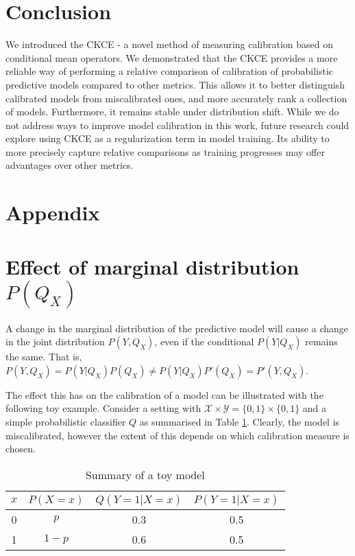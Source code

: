\documentclass[twocolumn]{article}
\theoremstyle{definition}
\begin{document}




\section{Conclusion}

We introduced the CKCE - a novel method of measuring calibration based on conditional mean operators. We demonstrated that the CKCE provides a more reliable way of performing a relative comparison of calibration of probabilistic predictive models compared to other metrics. This allows it to better distinguish calibrated models from miscalibrated ones, and more accurately rank a collection of models. Furthermore, it remains stable under distribution shift. While we do not address ways to improve model calibration in this work, future research could explore using CKCE as a regularization term in model training. Its ability to more precisely capture relative comparisons as training progresses may offer advantages over other metrics.

\newpage 



\newpage
\appendix
\onecolumn

\section*{Appendix}

\section{Effect of marginal distribution $P(Q_X)$} \label{Ap:toy}

A change in the marginal distribution of the predictive model will cause a change in the joint distribution $P(Y, Q_X)$, even if the conditional $P(Y|Q_X)$ remains the same. That is, $P(Y, Q_X) = P(Y|Q_X)P(Q_X) \neq P(Y|Q_X)P'(Q_X) = P'(Y, Q_X)$.  

The effect this has on the calibration of a model can be illustrated with the following toy example. Consider a setting with $\mathcal{X}\times \mathcal{Y} = \{0,1\} \times \{0,1\}$ and a simple probabilistic classifier $Q$ as summarised in Table \ref{tab:toy}. Clearly, the model is miscalibrated, however the extent of this depends on which calibration measure is chosen. 
\begin{table}[htbp]
    \centering
    \caption{Summary of a toy model}
    \begin{tabular}{c|ccc}
    \toprule
         $x$ & $P(X=x)$ & $Q(Y=1 | X=x)$ & $P(Y=1 | X=x)$ \\ \hline 
         0 & $p$ & 0.3 & 0.5 \\
         1 & $1-p$ & 0.6 & 0.5 \\
    \bottomrule
    \end{tabular}
    \label{tab:toy}
\end{table}
\end{document}
